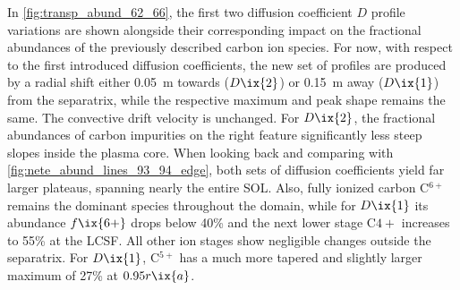                 In \cref{fig:transp_abund_62_66}, the first two diffusion coefficient $D$ profile variations are shown alongside their corresponding impact on the fractional abundances of the previously described carbon ion species. For now, with respect to the first introduced diffusion coefficients, the new set of profiles are produced by a radial shift either \SI{0.05}{\meter} towards ($D\ix{2}$) or \SI{0.15}{\meter} away ($D\ix{1}$) from the separatrix, while the respective maximum and peak shape remains the same. The convective drift velocity is unchanged. For $D\ix{2}$, the fractional abundances of carbon impurities on the right feature significantly less steep slopes inside the plasma core. When looking back and comparing with \cref{fig:nete_abund_lines_93_94_edge}, both sets of diffusion coefficients yield far larger plateaus, spanning nearly the entire SOL. Also, fully ionized carbon C$^{6+}$ remains the dominant species throughout the domain, while for $D\ix{1}$ its abundance $f\ix{6+}$ drops below 40\% and the next lower stage C${4+}$ increases to 55\% at the LCSF. All other ion stages show negligible changes outside the separatrix. For $D\ix{1}$, C$^{5+}$ has a much more tapered and slightly larger maximum of 27\% at $0.95r\ix{a}$.\\%
%
                \begin{figure}[t]%
                    \centering%
                    \begin{minipage}[b]{0.48\textwidth}%
                        \centering%
                    \end{minipage}%
                    \hfill%
                    \begin{minipage}[b]{0.48\textwidth}%
                        \centering%
                    \end{minipage}%
                    \label{fig:rad_ratios_total_62_66}%
                \end{figure}%

